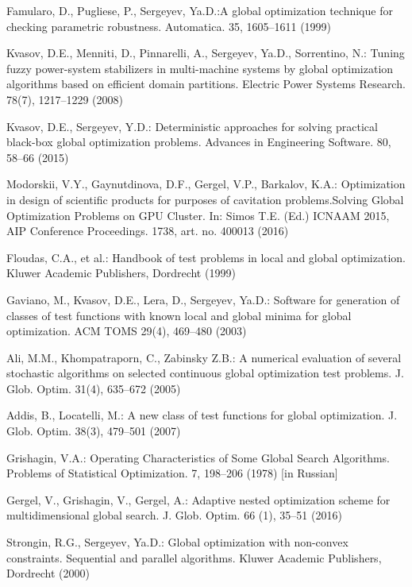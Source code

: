 \documentclass{llncs}
\begin{document}
\begin{thebibliography}{99}

Famularo, D., Pugliese, P., Sergeyev, Ya.D.:A global optimization technique for checking parametric robustness. Automatica. 35, 1605--1611 (1999)

Kvasov, D.E., Menniti, D., Pinnarelli, A., Sergeyev, Ya.D., Sorrentino, N.: Tuning fuzzy power-system stabilizers in multi-machine systems by global optimization algorithms based on efficient domain partitions. Electric Power Systems Research. 78(7), 1217--1229 (2008)

Kvasov, D.E., Sergeyev, Y.D.: Deterministic approaches for solving practical black-box global optimization problems. Advances in Engineering Software. 80, 58--66 (2015)

Modorskii, V.Y., Gaynutdinova, D.F., Gergel, V.P., Barkalov, K.A.: Optimization in design of scientific products for purposes of cavitation problems.Solving Global Optimization Problems on GPU Cluster. In: Simos T.E. (Ed.) ICNAAM 2015, AIP Conference Proceedings. 1738, art. no. 400013 (2016)

Floudas, C.A., et al.: Handbook of test problems in local and global optimization. Kluwer Academic Publishers, Dordrecht (1999)

Gaviano, M., Kvasov, D.E., Lera, D., Sergeyev, Ya.D.: Software for generation of classes of test functions with known local and global minima for global optimization. ACM TOMS 29(4), 469--480 (2003)

 Ali, M.M., Khompatraporn, C., Zabinsky Z.B.: A numerical evaluation of several stochastic algorithms on selected continuous global optimization test problems. J. Glob. Optim. 31(4), 635--672 (2005)

 Addis, B., Locatelli, M.: A new class of test functions for global optimization. J. Glob. Optim. 38(3), 479--501 (2007)

Grishagin, V.A.: Operating Characteristics of Some Global Search Algorithms. Problems of Statistical Optimization. 7, 198--206 (1978) [in Russian]

Gergel, V., Grishagin, V., Gergel, A.: Adaptive nested optimization scheme for multidimensional global search. J. Glob. Optim. 66 (1), 35--51 (2016)

Strongin, R.G., Sergeyev, Ya.D.: Global optimization with non-convex constraints. Sequential and parallel algorithms. Kluwer Academic Publishers, Dordrecht (2000)


\end{thebibliography}
\end{document}
